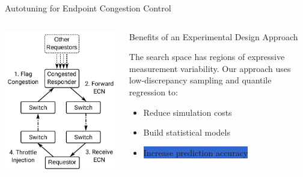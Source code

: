 \documentclass[10pt, compress, aspectratio=169, xcolor={table,usenames,dvipsnames}]{beamer}
\begin{document}
\begin{frame}[label={sec:org73078e2}]{Autotuning for Endpoint Congestion Control}
\begin{columns}
\begin{column}{0.4\columnwidth}
\begin{center}
\includegraphics[width=\columnwidth]{../../../img/congestion.pdf}
\end{center}
\end{column}
\begin{column}{0.6\columnwidth}
\begin{block}{Benefits of an Experimental Design Approach}
\vspace{0.8em}

The search  space has  regions of  expressive \alert{measurement  variability}.  Our
approach uses low-discrepancy sampling and quantile regression to:

\begin{itemize}
\item Reduce \alert{simulation costs}
\item Build \alert{statistical models}
\item \colorbox{Highlight}{Increase \alert{prediction accuracy}}
\end{itemize}
\end{block}
\end{column}
\end{columns}
\end{frame}
\end{document}
